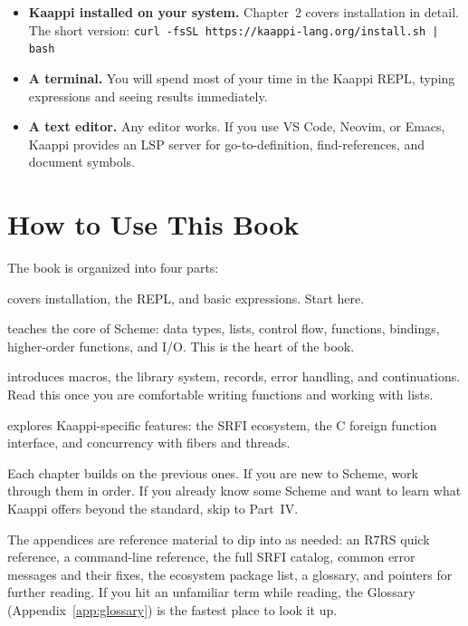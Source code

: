 \documentclass[11pt,twoside,openright]{memoir}
\begin{document}
\begin{itemize}
    \item \textbf{Kaappi installed on your system.} Chapter~2 covers installation in detail. The short version: \texttt{curl -fsSL https://kaappi-lang.org/\allowbreak install.sh | bash}
    \item \textbf{A terminal.} You will spend most of your time in the Kaappi REPL, typing expressions and seeing results immediately.
    \item \textbf{A text editor.} Any editor works. If you use VS Code, Neovim, or Emacs, Kaappi provides an LSP server for go-to-definition, find-references, and document symbols.
\end{itemize}

\section*{How to Use This Book}

The book is organized into four parts:

\begin{description}[leftmargin=1em, labelindent=0em]
    \item[Part I: Getting Started] covers installation, the REPL, and basic expressions. Start here.
    \item[Part II: The Language] teaches the core of Scheme: data types, lists, control flow, functions, bindings, higher-order functions, and I/O. This is the heart of the book.
    \item[Part III: Going Further] introduces macros, the library system, records, error handling, and continuations. Read this once you are comfortable writing functions and working with lists.
    \item[Part IV: Beyond R7RS] explores Kaappi-specific features: the SRFI ecosystem, the C foreign function interface, and concurrency with fibers and threads.
\end{description}

Each chapter builds on the previous ones. If you are new to Scheme, work through them in order. If you already know some Scheme and want to learn what Kaappi offers beyond the standard, skip to Part~IV.

The appendices are reference material to dip into as needed: an R7RS quick reference, a command-line reference, the full SRFI catalog, common error messages and their fixes, the ecosystem package list, a glossary, and pointers for further reading. If you hit an unfamiliar term while reading, the Glossary (Appendix~\ref{app:glossary}) is the fastest place to look it up.
\end{document}
